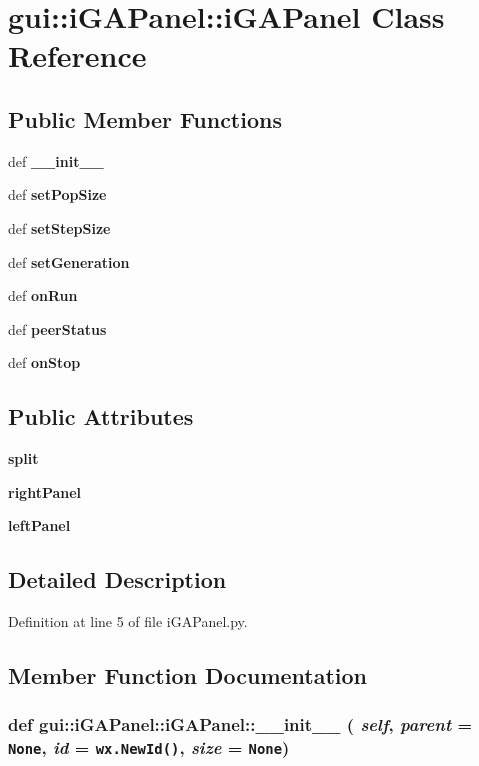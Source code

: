 \section{gui::iGAPanel::iGAPanel Class Reference}
\label{classgui_1_1iGAPanel_1_1iGAPanel}
\subsection*{Public Member Functions}
\begin{CompactItemize}
\item 
def {\bf \_\-\_\-init\_\-\_\-}
\item 
def {\bf setPopSize}
\item 
def {\bf setStepSize}
\item 
def {\bf setGeneration}
\item 
def {\bf onRun}
\item 
def {\bf peerStatus}
\item 
def {\bf onStop}
\end{CompactItemize}
\subsection*{Public Attributes}
\begin{CompactItemize}
\item 
{\bf split}
\item 
{\bf rightPanel}
\item 
{\bf leftPanel}
\end{CompactItemize}


\subsection{Detailed Description}


Definition at line 5 of file iGAPanel.py.

\subsection{Member Function Documentation}
\subsubsection{\setlength{\rightskip}{0pt plus 5cm}def gui::iGAPanel::iGAPanel::\_\-\_\-init\_\-\_\- ( {\em self},  {\em parent} = {\tt None},  {\em id} = {\tt wx.NewId()},  {\em size} = {\tt None})}\label{classgui_1_1iGAPanel_1_1iGAPanel_7e461d1fd027487f828aa08d09a7d8ed}




